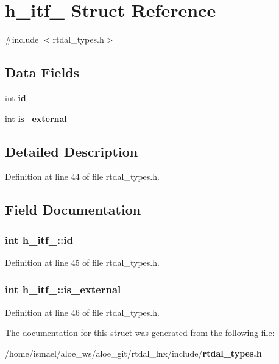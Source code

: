 \section{h\-\_\-itf\-\_\- Struct Reference}
\label{structh__itf__}


{\ttfamily \#include $<$rtdal\-\_\-types.\-h$>$}

\subsection*{Data Fields}
\begin{DoxyCompactItemize}
\item 
int {\bf id}
\item 
int {\bf is\-\_\-external}
\end{DoxyCompactItemize}


\subsection{Detailed Description}


Definition at line 44 of file rtdal\-\_\-types.\-h.



\subsection{Field Documentation}
\subsubsection[{id}]{\setlength{\rightskip}{0pt plus 5cm}int h\-\_\-itf\-\_\-\-::id}\label{structh__itf___abef006ee2e660568174317099553d1d2}


Definition at line 45 of file rtdal\-\_\-types.\-h.

\subsubsection[{is\-\_\-external}]{\setlength{\rightskip}{0pt plus 5cm}int h\-\_\-itf\-\_\-\-::is\-\_\-external}\label{structh__itf___a5f14435220765d8722f0cd55cadb7d5a}


Definition at line 46 of file rtdal\-\_\-types.\-h.



The documentation for this struct was generated from the following file\-:\begin{DoxyCompactItemize}
\item 
/home/ismael/aloe\-\_\-ws/aloe\-\_\-git/rtdal\-\_\-lnx/include/{\bf rtdal\-\_\-types.\-h}\end{DoxyCompactItemize}
